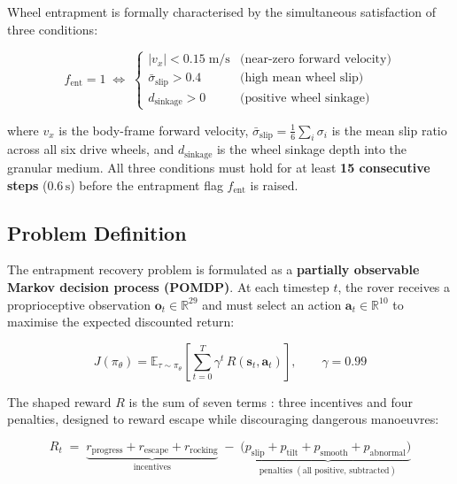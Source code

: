 \documentclass[12pt,a4paper]{article}
\begin{document}
\vspace{4pt}
Wheel entrapment is formally characterised by the simultaneous satisfaction of three conditions:

\begin{tcolorbox}[dashedbox]
\begin{equation}
    f_{\text{ent}} = 1 \;\iff\;
    \begin{cases}
        |v_x| < 0.15\;\text{m/s} & \text{(near-zero forward velocity)} \\[4pt]
        \bar{\sigma}_{\text{slip}} > 0.4 & \text{(high mean wheel slip)} \\[4pt]
        d_{\text{sinkage}} > 0 & \text{(positive wheel sinkage)}
    \end{cases}
    \label{eq:entrapment_definition}
\end{equation}
\end{tcolorbox}

\noindent where $v_x$ is the body-frame forward velocity, $\bar{\sigma}_{\text{slip}} = \frac{1}{6}\sum_i \sigma_i$ is the mean slip ratio across all six drive wheels, and $d_{\text{sinkage}}$ is the wheel sinkage depth into the granular medium. All three conditions must hold for at least \textbf{15 consecutive steps} ($0.6\,\text{s}$) before the entrapment flag $f_{\text{ent}}$ is raised.

\subsection{Problem Definition}

The entrapment recovery problem is formulated as a \textbf{partially observable Markov decision process (POMDP)}. At each timestep $t$, the rover receives a proprioceptive observation $\mathbf{o}_t \in \mathbb{R}^{29}$ and must select an action $\mathbf{a}_t \in \mathbb{R}^{10}$ to maximise the expected discounted return:
\begin{tcolorbox}[dashedbox]
\begin{equation}
    J(\pi_\theta) = \mathbb{E}_{\tau \sim \pi_\theta}
    \left[ \sum_{t=0}^{T} \gamma^t\, R(\mathbf{s}_t, \mathbf{a}_t) \right], \qquad \gamma = 0.99
    \label{eq:objective}
\end{equation}
\end{tcolorbox}

The shaped reward $R$ is the sum of seven terms : three incentives and four penalties, designed to reward escape while discouraging dangerous manoeuvres:

\begin{tcolorbox}[dashedbox]
\begin{equation}
    R_t \;=\; \underbrace{r_{\text{progress}} + r_{\text{escape}} + r_{\text{rocking}}}_{\text{incentives}}
          \;-\; (\underbrace{p_{\text{slip}} + p_{\text{tilt}} + p_{\text{smooth}} + p_{\text{abnormal}})}_{\text{penalties} \;(\text{all positive, subtracted})}
    \label{eq:reward_total}
\end{equation}
\end{tcolorbox}
\end{document}
